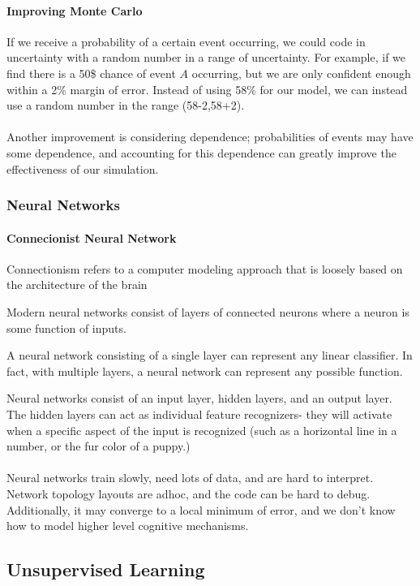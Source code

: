 \documentclass{chezarticle}
\begin{document}
\paragraph{Improving Monte Carlo} If we receive a probability of a certain event occurring, we could code in uncertainty with a random number in a range of uncertainty. For example, if we find there is a 50\$ chance of event $A$ occurring, but we are only confident enough within a 2\% margin of error. Instead of using 58\% for our model, we can instead use a random number in the range (58-2,58+2).\\
\\
Another improvement is considering dependence; probabilities of events may have some dependence, and accounting for this dependence can greatly improve the effectiveness of our simulation.

\subsubsection{Neural Networks}
\paragraph{Connecionist Neural Network}
\begin{definition}
Connectionism refers to a computer modeling approach that is loosely based on the architecture of the brain
\end{definition}
Modern neural networks consist of layers of connected neurons where a neuron is some function of inputs.
\begin{fact}
A neural network consisting of a single layer can represent any linear classifier. In fact, with multiple layers, a neural network can represent any possible function.
\end{fact}
Neural networks consist of an input layer, hidden layers, and an output layer. The hidden layers can act as individual feature recognizers- they will activate when a specific aspect of the input is recognized (such as a horizontal line in a number, or the fur color of a puppy.) 
\\
\\
Neural networks train slowly, need lots of data, and are hard to interpret. Network topology layouts are adhoc, and the code can be hard to debug. Additionally, it may converge to a local minimum of error, and we don't know how to model higher level cognitive mechanisms. 

\subsection{Unsupervised Learning}
\end{document}
